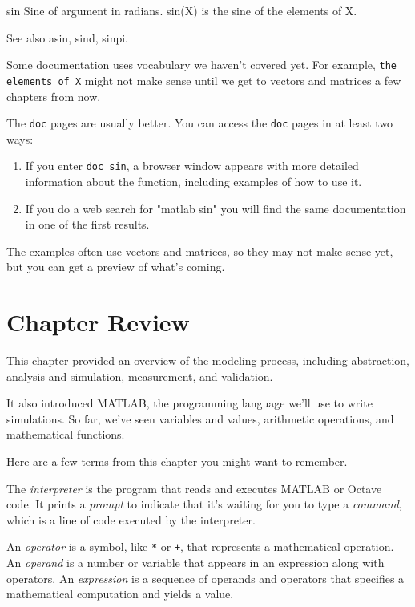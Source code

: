 \begin{stdout}
 sin    Sine of argument in radians.
    sin(X) is the sine of the elements of X.

    See also asin, sind, sinpi.
\end{stdout}

Some documentation uses vocabulary we haven't covered yet.
For example, \lstinline{the elements of X} might not make sense until
we get to vectors and matrices a few chapters from now.


The \lstinline{doc} pages are usually better.  You can access the \lstinline{doc} pages in at least two ways:

\begin{enumerate}
\item If you enter \lstinline{doc sin}, a browser window appears with more detailed information about the function, including examples of how to use it. 
\item If you do a web search for "matlab sin" you will find the same documentation in one of the first results.
\end{enumerate}
The examples often use vectors and matrices, so they may not make sense yet,
but you can get a preview of what's coming.


\section{Chapter Review}

This chapter provided an overview of the modeling process, including abstraction, analysis and simulation, measurement, and validation.

It also introduced MATLAB, the programming language we'll use to write simulations.  So far, we've seen variables and values, arithmetic operations, and mathematical functions.

Here are a few terms from this chapter you might want to remember.

The \emph{interpreter} is the program that reads and executes MATLAB or \mbox{Octave} code.
It prints a \emph{prompt} to indicate that it's waiting for you to type a \emph{command}, which is a line of code executed by the interpreter.

An \emph{operator} is a symbol, like \lstinline{*} or \lstinline{+}, that
represents a mathematical operation.
An \emph{operand} is a number or variable that appears in an expression along
with operators.
An \emph{expression} is a sequence of operands and operators that specifies
a mathematical computation and yields a value.

